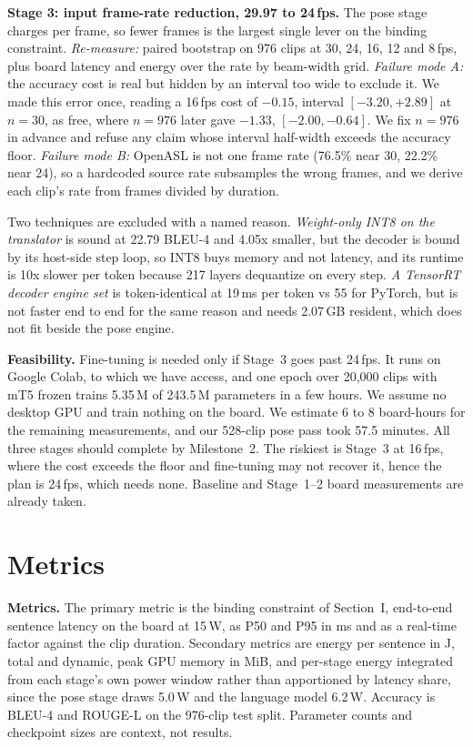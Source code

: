 \documentclass[conference]{IEEEtran}
\begin{document}
\textbf{Stage 3: input frame-rate reduction, 29.97 to 24\,fps.} The pose stage charges per
frame, so fewer frames is the largest single lever on the binding constraint.
\emph{Re-measure:} paired bootstrap on 976 clips at 30, 24, 16, 12 and 8\,fps, plus board
latency and energy over the rate by beam-width grid. \emph{Failure mode A:} the accuracy
cost is real but hidden by an interval too wide to exclude it. We made this error once,
reading a 16\,fps cost of $-0.15$, interval $[-3.20, +2.89]$ at $n{=}30$, as free, where
$n{=}976$ later gave $-1.33$, $[-2.00, -0.64]$. We fix $n{=}976$ in advance and refuse any
claim whose interval half-width exceeds the accuracy floor. \emph{Failure mode B:} OpenASL
is not one frame rate (76.5\% near 30, 22.2\% near 24), so a hardcoded source rate
subsamples the wrong frames, and we derive each clip's rate from frames divided by
duration.

Two techniques are excluded with a named reason. \emph{Weight-only INT8 on the translator}
is sound at 22.79 BLEU-4 and 4.05x smaller, but the decoder is bound by its host-side step
loop, so INT8 buys memory and not latency, and its runtime is 10x slower per token because
217 layers dequantize on every step. \emph{A TensorRT decoder engine set} is
token-identical at 19\,ms per token vs 55 for PyTorch, but is not faster end to end for the
same reason and needs 2.07\,GB resident, which does not fit beside the pose engine.

\textbf{Feasibility.} Fine-tuning is needed only if Stage~3 goes past 24\,fps. It runs on
Google Colab, to which we have access, and one epoch over 20{,}000 clips with mT5 frozen
trains 5.35\,M of 243.5\,M parameters in a few hours. We assume no desktop GPU and train
nothing on the board. We estimate 6 to 8 board-hours for the remaining measurements, and our 528-clip pose pass took 57.5 minutes. All three stages should complete by Milestone~2. The riskiest is
Stage~3 at 16\,fps, where the cost exceeds the floor and fine-tuning may not recover it,
hence the plan is 24\,fps, which needs none. Baseline and Stage~1--2 board measurements
are already taken.

\section{Metrics}

\label{m1}\textbf{Metrics.} The primary metric is the binding constraint of Section~I,
end-to-end sentence latency on the board at 15\,W, as P50 and P95 in ms and as a
real-time factor against the clip duration. Secondary metrics are energy per
sentence in J, total and dynamic, peak GPU memory in MiB, and per-stage energy integrated
from each stage's own power window rather than apportioned by latency share, since the
pose stage draws 5.0\,W and the language model 6.2\,W. Accuracy is BLEU-4 and ROUGE-L on
the 976-clip test split. Parameter counts and checkpoint sizes are context, not results.
\end{document}
